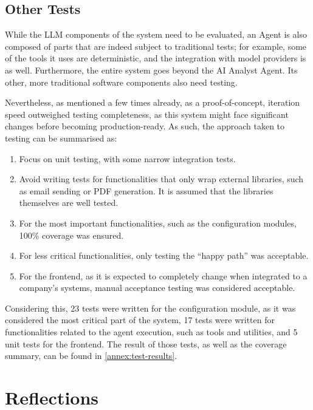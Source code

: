 \documentclass[a4paper]{report}
\begin{document}
\section{Other Tests}
\label{sec:other-tests}

While the LLM components of the system need to be evaluated, an Agent is also composed of parts that are indeed subject to traditional tests; for example, some of the tools it uses are deterministic, and the integration with model providers is as well. Furthermore, the entire system goes beyond the AI Analyst Agent. Its other, more traditional software components also need testing.

Nevertheless, as mentioned a few times already, as a proof-of-concept, iteration speed outweighed testing completeness, as this system might face significant changes before becoming production-ready. As such, the approach taken to testing can be summarised as:

\begin{enumerate}
    \item Focus on unit testing, with some narrow integration tests.
    \item Avoid writing tests for functionalities that only wrap external libraries, such as email sending or PDF generation. It is assumed that the libraries themselves are well tested.
    \item For the most important functionalities, such as the configuration modules, 100\% coverage was ensured.
    \item For less critical functionalities, only testing the ``happy path'' was acceptable.
    \item For the frontend, as it is expected to completely change when integrated to a company's systems, manual acceptance testing was considered acceptable.
\end{enumerate}

Considering this, 23 tests were written for the configuration module, as it was considered the most critical part of the system, 17 tests were written for functionalities related to the agent execution, such as tools and utilities, and 5 unit tests for the frontend. The result of those tests, as well as the coverage summary, can be found in \autoref{annex:test-results}.

\chapter{Reflections}
\label{chapter:reflections}
\end{document}
